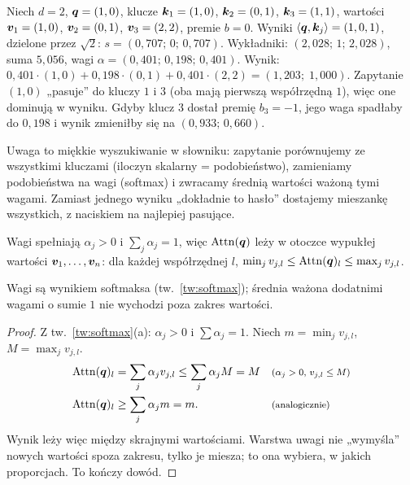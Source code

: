 \begin{przyklad}\label{prz:uwaga}
Niech $d=2$, $\bm{q}=(1,0)$, klucze $\bm{k}_1=(1,0)$, $\bm{k}_2=(0,1)$, $\bm{k}_3=(1,1)$, wartości $\bm{v}_1=(1,0)$, $\bm{v}_2=(0,1)$, $\bm{v}_3=(2,2)$, premie $b=0$.
Wyniki $\left\langle \bm{q},\bm{k}_j\right\rangle=(1,0,1)$, dzielone przez $\sqrt2$: $s=(0{,}707;\,0;\,0{,}707)$. Wykładniki: $(2{,}028;\,1;\,2{,}028)$, suma $5{,}056$, wagi $\alpha=(0{,}401;\,0{,}198;\,0{,}401)$.
Wynik: $0{,}401\cdot(1,0)+0{,}198\cdot(0,1)+0{,}401\cdot(2,2)=(1{,}203;\;1{,}000)$.
Zapytanie $(1,0)$ „pasuje” do kluczy $1$ i $3$ (oba mają pierwszą współrzędną $1$), więc one dominują w wyniku. Gdyby klucz $3$ dostał premię $b_3=-1$, jego waga spadłaby do $0{,}198$ i wynik zmieniłby się na $(0{,}933;\,0{,}660)$.
\end{przyklad}

\begin{intuicja}
Uwaga to miękkie wyszukiwanie w słowniku: zapytanie porównujemy ze wszystkimi kluczami (iloczyn skalarny = podobieństwo), zamieniamy podobieństwa na wagi (softmax) i zwracamy średnią wartości ważoną tymi wagami.
Zamiast jednego wyniku „dokładnie to hasło” dostajemy mieszankę wszystkich, z naciskiem na najlepiej pasujące.
\end{intuicja}

\begin{twierdzenie}\label{tw:uwaga-wypukla}
Wagi spełniają $\alpha_j>0$ i $\sum_j\alpha_j=1$, więc $\operatorname{Attn}(\bm{q})$ leży w otoczce wypukłej wartości $\bm{v}_1,\dots,\bm{v}_n$: dla każdej współrzędnej $l$,
$\min_jv_{j,l}\le\operatorname{Attn}(\bm{q})_l\le\max_jv_{j,l}$.
\end{twierdzenie}
\begin{pomyslDowodu}
Wagi są wynikiem softmaksa (tw.~\ref{tw:softmax}); średnia ważona dodatnimi wagami o sumie $1$ nie wychodzi poza zakres wartości.
\end{pomyslDowodu}
\begin{proof}
Z tw.~\ref{tw:softmax}(a): $\alpha_j>0$ i $\sum\alpha_j=1$. Niech $m=\min_jv_{j,l}$, $M=\max_jv_{j,l}$.
\begin{align*}
\operatorname{Attn}(\bm{q})_l &= \sum_j\alpha_jv_{j,l}\le\sum_j\alpha_jM=M && \text{\footnotesize ($\alpha_j>0$, $v_{j,l}\le M$)}\\
\operatorname{Attn}(\bm{q})_l &\ge \sum_j\alpha_jm=m. && \text{\footnotesize (analogicznie)}
\end{align*}
Wynik leży więc między skrajnymi wartościami. Warstwa uwagi nie „wymyśla” nowych wartości spoza zakresu, tylko je miesza; to ona wybiera, w jakich proporcjach. To kończy dowód.
\end{proof}

